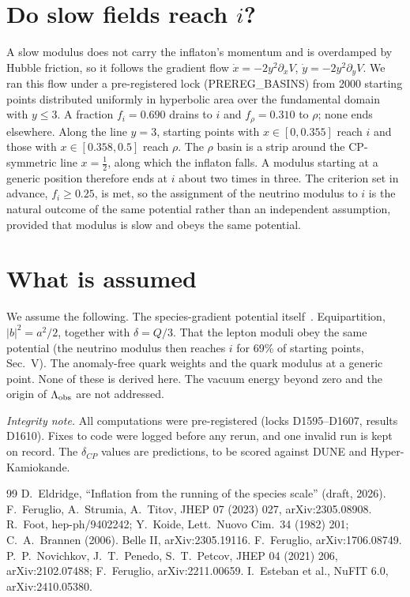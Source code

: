 \documentclass[aps,prd,twocolumn,superscriptaddress,nofootinbib,showkeys]{revtex4-2}
\begin{document}
\section{Do slow fields reach $i$?}
A slow modulus does not carry the inflaton's momentum and is overdamped by Hubble friction, so it follows the gradient flow $\dot x=-2y^2\partial_xV$, $\dot y=-2y^2\partial_yV$. We ran this flow under a pre-registered lock (PREREG\_BASINS) from 2000 starting points distributed uniformly in hyperbolic area over the fundamental domain with $y\le3$. A fraction $f_i=0.690$ drains to $i$ and $f_\rho=0.310$ to $\rho$; none ends elsewhere. Along the line $y=3$, starting points with $x\in[0,0.355]$ reach $i$ and those with $x\in[0.358,0.5]$ reach $\rho$. The $\rho$ basin is a strip around the CP-symmetric line $x=\tfrac12$, along which the inflaton falls. A modulus starting at a generic position therefore ends at $i$ about two times in three. The criterion set in advance, $f_i\ge0.25$, is met, so the assignment of the neutrino modulus to $i$ is the natural outcome of the same potential rather than an independent assumption, provided that modulus is slow and obeys the same potential.

\section{What is assumed}
We assume the following. The species-gradient potential itself~\cite{P1}. Equipartition, $|b|^2=a^2/2$, together with $\delta=Q/3$. That the lepton moduli obey the same potential (the neutrino modulus then reaches $i$ for 69\% of starting points, Sec.~V). The anomaly-free quark weights and the quark modulus at a generic point. None of these is derived here. The vacuum energy beyond zero and the origin of $\Lambda_{\rm obs}$ are not addressed.

\emph{Integrity note.} All computations were pre-registered (locks D1595--D1607, results D1610). Fixes to code were logged before any rerun, and one invalid run is kept on record. The $\delta_{CP}$ values are predictions, to be scored against DUNE and Hyper-Kamiokande.

\begin{thebibliography}{99}
 D.~Eldridge, ``Inflation from the running of the species scale'' (draft, 2026).
 F.~Feruglio, A.~Strumia, A.~Titov, JHEP 07 (2023) 027, arXiv:2305.08908.
 R.~Foot, hep-ph/9402242; Y.~Koide, Lett.~Nuovo Cim.~34 (1982) 201; C.~A.~Brannen (2006).
 Belle II, arXiv:2305.19116.
 F.~Feruglio, arXiv:1706.08749.
 P.~P.~Novichkov, J.~T.~Penedo, S.~T.~Petcov, JHEP 04 (2021) 206, arXiv:2102.07488; F.~Feruglio, arXiv:2211.00659.
 I.~Esteban et al., NuFIT 6.0, arXiv:2410.05380.
\end{thebibliography}
\end{document}
